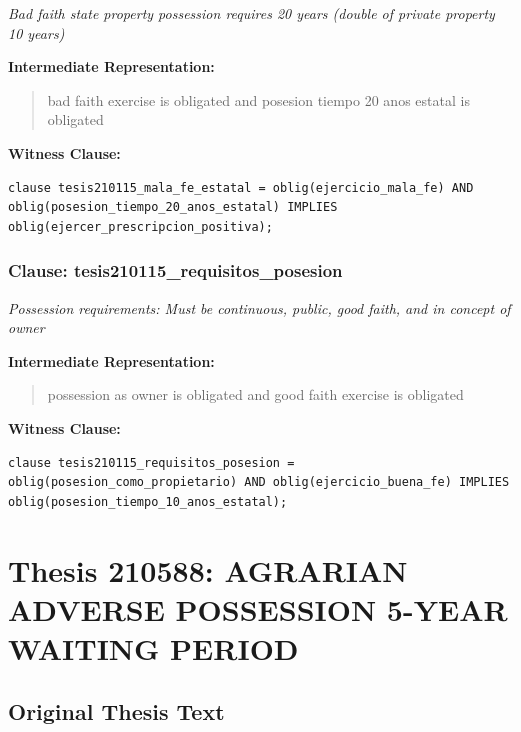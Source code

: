 \documentclass[11pt,a4paper]{article}
\begin{document}
\textit{Bad faith state property possession requires 20 years (double of private property 10 years)}

\textbf{Intermediate Representation:}

\begin{quote}
bad faith exercise is obligated and posesion tiempo 20 anos estatal is obligated
\end{quote}

\textbf{Witness Clause:}

\begin{lstlisting}[style=witnessstyle, language=Witness]
clause tesis210115_mala_fe_estatal = oblig(ejercicio_mala_fe) AND oblig(posesion_tiempo_20_anos_estatal) IMPLIES oblig(ejercer_prescripcion_positiva);
\end{lstlisting}

\subsubsection{Clause: tesis210115\_requisitos\_posesion}

\textit{Possession requirements: Must be continuous, public, good faith, and in concept of owner}

\textbf{Intermediate Representation:}

\begin{quote}
possession as owner is obligated and good faith exercise is obligated
\end{quote}

\textbf{Witness Clause:}

\begin{lstlisting}[style=witnessstyle, language=Witness]
clause tesis210115_requisitos_posesion = oblig(posesion_como_propietario) AND oblig(ejercicio_buena_fe) IMPLIES oblig(posesion_tiempo_10_anos_estatal);
\end{lstlisting}

\newpage

\section{Thesis 210588: AGRARIAN ADVERSE POSSESSION 5-YEAR WAITING PERIOD}
\label{thesis:210588}

\subsection{Original Thesis Text}
\end{document}
